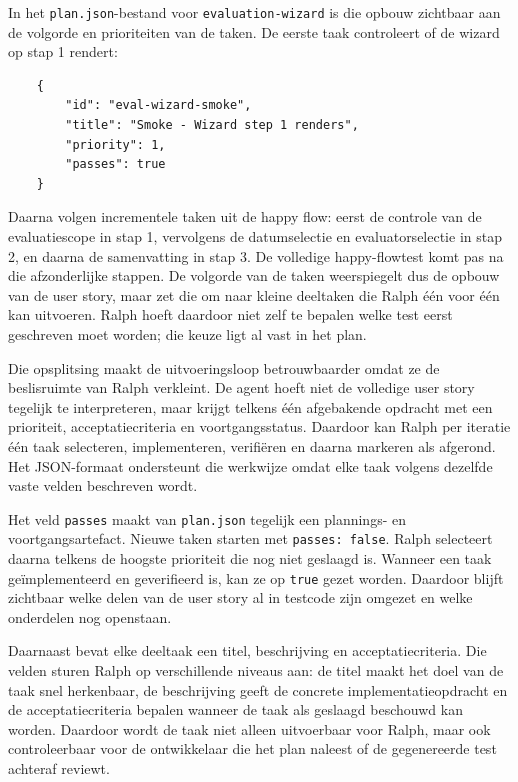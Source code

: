 In het \texttt{plan.json}-bestand voor \texttt{evaluation-wizard} is die opbouw zichtbaar aan de volgorde en prioriteiten van de taken. De eerste taak controleert of de wizard op stap 1 rendert:

\begin{verbatim}
    {
        "id": "eval-wizard-smoke",
        "title": "Smoke - Wizard step 1 renders",
        "priority": 1,
        "passes": true
    }
\end{verbatim}

Daarna volgen incrementele taken uit de happy flow: eerst de controle van de evaluatiescope in stap 1, vervolgens de datumselectie en evaluatorselectie in stap 2, en daarna de samenvatting in stap 3. De volledige happy-flowtest komt pas na die afzonderlijke stappen. De volgorde van de taken weerspiegelt dus de opbouw van de user story, maar zet die om naar kleine deeltaken die Ralph één voor één kan uitvoeren. Ralph hoeft daardoor niet zelf te bepalen welke test eerst geschreven moet worden; die keuze ligt al vast in het plan.

Die opsplitsing maakt de uitvoeringsloop betrouwbaarder omdat ze de beslisruimte van Ralph verkleint. De agent hoeft niet de volledige user story tegelijk te interpreteren, maar krijgt telkens één afgebakende opdracht met een prioriteit, acceptatiecriteria en voortgangsstatus. Daardoor kan Ralph per iteratie één taak selecteren, implementeren, verifiëren en daarna markeren als afgerond. Het JSON-formaat ondersteunt die werkwijze omdat elke taak volgens dezelfde vaste velden beschreven wordt.

Het veld \texttt{passes} maakt van \texttt{plan.json} tegelijk een plannings- en voortgangsartefact. Nieuwe taken starten met \texttt{passes: false}. Ralph selecteert daarna telkens de hoogste prioriteit die nog niet geslaagd is. Wanneer een taak geïmplementeerd en geverifieerd is, kan ze op \texttt{true} gezet worden. Daardoor blijft zichtbaar welke delen van de user story al in testcode zijn omgezet en welke onderdelen nog openstaan.

Daarnaast bevat elke deeltaak een titel, beschrijving en acceptatiecriteria. Die velden sturen Ralph op verschillende niveaus aan: de titel maakt het doel van de taak snel herkenbaar, de beschrijving geeft de concrete implementatieopdracht en de acceptatiecriteria bepalen wanneer de taak als geslaagd beschouwd kan worden. Daardoor wordt de taak niet alleen uitvoerbaar voor Ralph, maar ook controleerbaar voor de ontwikkelaar die het plan naleest of de gegenereerde test achteraf reviewt.

